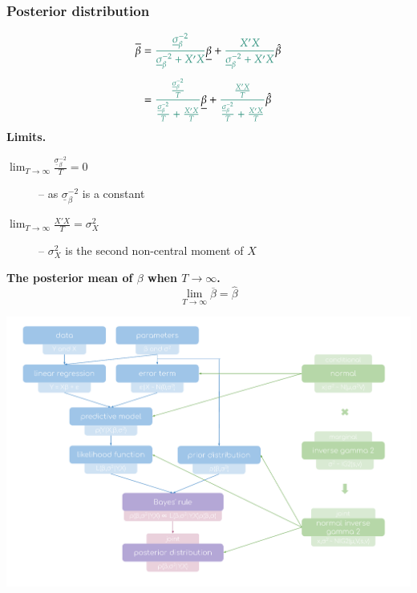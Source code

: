 \documentclass[notes,blackandwhite,mathsans]{beamer}
\begin{document}
\begin{frame}
\frametitle{Posterior distribution}

\small
\begin{align*}
\overline{\beta} &= {\color{mcxs2}\frac{\underline{\sigma}_{\beta}^{-2}}{ \underline{\sigma}_{\beta}^{-2} + X'X }} \underline{\beta} + {\color{mcxs2}\frac{X'X}{ \underline{\sigma}_{\beta}^{-2} + X'X }} \hat\beta \\[1ex]
&= {\color{mcxs2}\frac{\frac{\underline{\sigma}_{\beta}^{-2}}{T}}{ \frac{\underline{\sigma}_{\beta}^{-2}}{T} + \frac{X'X}{T} }} \underline{\beta} + {\color{mcxs2}\frac{\frac{X'X}{T}}{ \frac{\underline{\sigma}_{\beta}^{-2}}{T} + \frac{X'X}{T} }} \hat\beta
\end{align*}
\normalsize\textbf{Limits.}\small
\begin{description}
\item[$\lim_{T\rightarrow\infty}\frac{\underline{\sigma}_{\beta}^{-2}}{T} = 0 $] -- as $\underline{\sigma}_{\beta}^{-2}$ is a constant
\item[$\lim_{T\rightarrow\infty}\frac{X'X}{T} = \sigma_X^2$] -- $\sigma_X^2$ is the second non-central moment of $X$
\end{description}

\bigskip\normalsize\textbf{The posterior mean of $\beta$ when $T\rightarrow \infty$.}
$$ \lim_{T\rightarrow\infty}\overline{\beta} = \hat\beta $$
\end{frame}






\begin{frame}

\centering
\includegraphics[scale=0.45, trim= 1.8cm 2cm 2cm 0.5cm]{grphs/03conceptmap.pdf}

\end{frame}
\end{document}
